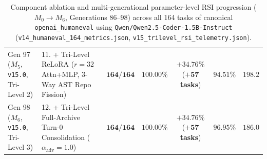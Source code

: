 \documentclass[10pt,twocolumn,letterpaper]{article}
\begin{document}
\begin{table}[t]
{\begin{small}
\begin{tabular}{@{}llccccc@{}}
Gen 97 ($M_{5}$, \texttt{v15.0}, Tri-Level 2) & 11. + Tri-Level ReLoRA ($r=32$ Attn+MLP, 3-Way AST Repo Fission) & $\mathbf{164 / 164}$ & $\mathbf{100.00\%}$ & $\mathbf{+34.76\%}$ ($\mathbf{+57}$ \textbf{tasks}) & $94.51\%$ & $198.2$ \\
Gen 98 ($M_{6}$, \texttt{v15.0}, Tri-Level 3) & 12. + Tri-Level Full-Archive Turn-0 Consolidation ($\alpha_{\text{adv}}=1.0$) & $\mathbf{164 / 164}$ & $\mathbf{100.00\%}$ & $\mathbf{+34.76\%}$ ($\mathbf{+57}$ \textbf{tasks}) & $\mathbf{96.95\%}$ & $\mathbf{186.0}$ \\
\bottomrule
\end{tabular}
\end{small}%
}
\caption{Component ablation and multi-generational parameter-level RSI progression ($M_{0}\to M_{6}$, Generations 86--98) across all 164 tasks of canonical \texttt{openai\_humaneval} using \texttt{Qwen/Qwen2.5-Coder-1.5B-Instruct} (\texttt{v14\_humaneval\_164\_metrics.json}, \texttt{v15\_trilevel\_rsi\_telemetry.json}).}
\label{tab:humaneval_164_ablation}
\end{table}
\end{document}
